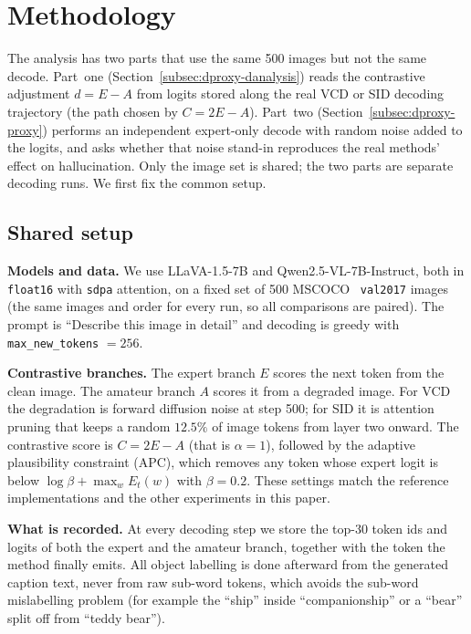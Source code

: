 
\section{Methodology}
\label{sec:dproxy-method}

The analysis has two parts that use the same 500 images but not the same decode.
Part~one (Section~\ref{subsec:dproxy-danalysis}) reads the contrastive adjustment
$d = E - A$ from logits stored along the real VCD or SID decoding trajectory (the
path chosen by $C = 2E - A$). Part~two (Section~\ref{subsec:dproxy-proxy})
performs an independent expert-only decode with random noise added to the logits,
and asks whether that noise stand-in reproduces the real methods' effect on
hallucination. Only the image set is shared; the two parts are separate decoding
runs. We first fix the common setup.

\subsection{Shared setup}
\label{subsec:dproxy-setup}

\textbf{Models and data.} We use LLaVA-1.5-7B and Qwen2.5-VL-7B-Instruct, both in
\texttt{float16} with \texttt{sdpa} attention, on a fixed set of 500 MSCOCO~\citep{lin2014coco}
\texttt{val2017} images (the same images and order for every run, so all
comparisons are paired). The prompt is ``Describe this image in detail'' and
decoding is greedy with \texttt{max\_new\_tokens} $=256$.

\textbf{Contrastive branches.} The expert branch $E$ scores the next token from
the clean image. The amateur branch $A$ scores it from a degraded image. For VCD
the degradation is forward diffusion noise at step 500; for SID it is attention
pruning that keeps a random $12.5\%$ of image tokens from layer two onward. The
contrastive score is $C = 2E - A$ (that is $\alpha = 1$), followed by the
adaptive plausibility constraint (APC), which removes any token whose expert
logit is below $\log\beta + \max_w E_t(w)$ with $\beta = 0.2$. These settings
match the reference implementations and the other experiments in this paper.

\textbf{What is recorded.} At every decoding step we store the top-30 token ids
and logits of both the expert and the amateur branch, together with the token
the method finally emits. All object labelling is done afterward from the
generated caption text, never from raw sub-word tokens, which avoids the sub-word
mislabelling problem (for example the ``ship'' inside ``companionship'' or a
``bear'' split off from ``teddy bear'').

